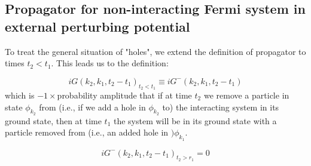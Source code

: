 \subsection{Propagator for non-interacting Fermi system in external perturbing potential}
To treat the general situation of "holes", we extend the definition of propagator to times $t_2<t_1$. This leads us to the definition:
\begin{imp}
\begin{equation}
    iG(k_2,k_1,t_2-t_1)_{t_2<t_1}\equiv i G^{-}\left(k_{2}, k_{1}, t_{2}-t_{1}\right)
\end{equation}
which is $-1\times$probability amplitude that if at time $t_{2}$ we remove a particle in state $\phi_{k_{2}}$ from (i.e., if we add a hole in $\phi_{k_{2}}$ to) the interacting system in its ground state, then at time $t_{1}$ the system will be in its ground state with a particle removed from (i.e., an added hole in $) \phi_{k_{1}}$.
\end{imp}
\begin{equation}i G^{-}\left(k_{2}, k_{1}, t_{2}-t_{1}\right)_{t_{2}>r_{1}}=0\end{equation}

